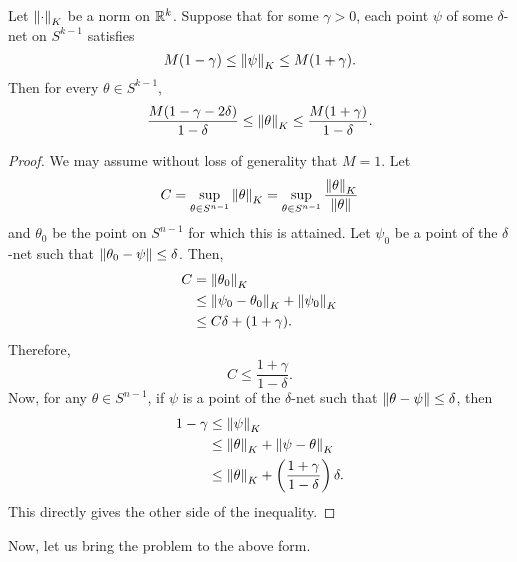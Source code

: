 \begin{lemma}
Let $\left\lVert\cdot\right\rVert_K$ be a norm on $\mathbb{R}^k$. Suppose that for some $\gamma>0$, each point $\psi$ of some $\delta$-net on $S^{k-1}$ satisfies
\[ M(1-\gamma)\leq\left\lVert\psi\right\rVert_K\leq M(1+\gamma). \]
Then for every $\theta\in S^{k-1}$,
\[ \frac{M(1-\gamma-2\delta)}{1-\delta} \leq \left\lVert\theta\right\rVert_K \leq \frac{M(1+\gamma)}{1-\delta}. \]
\end{lemma}
\begin{proof}
We may assume without loss of generality that $M=1$. Let
\[ C = \sup_{\theta\in S^{n-1}} \left\lVert\theta\right\rVert_K = \sup_{\theta\in S^{n-1}} \frac{\left\lVert\theta\right\rVert_K}{\left\lVert\theta\right\rVert} \]
and $\theta_0$ be the point on $S^{n-1}$ for which this is attained.
Let $\psi_0$ be a point of the $\delta$-net such that $\left\lVert\theta_0-\psi\right\rVert\leq\delta$. Then,
\begin{align*}
    C &= \left\lVert\theta_0\right\rVert_K \\
    &\leq \left\lVert\psi_0-\theta_0\right\rVert_K + \left\lVert\psi_0\right\rVert_K \\
    &\leq C\delta + (1+\gamma).
\end{align*}
Therefore,
\[ C \leq \frac{1+\gamma}{1-\delta}. \]
Now, for any $\theta\in S^{n-1}$, if $\psi$ is a point of the $\delta$-net such that $\left\lVert\theta-\psi\right\rVert\leq\delta$, then
\begin{align*}
    1-\gamma &\leq \left\lVert\psi\right\rVert_K \\
    &\leq \left\lVert\theta\right\rVert_K + \left\lVert\psi-\theta\right\rVert_K \\
    &\leq \left\lVert\theta\right\rVert_K + \left(\frac{1+\gamma}{1-\delta}\right)\delta.
\end{align*}
This directly gives the other side of the inequality.
\end{proof}

Now, let us bring the problem to the above form.\\

